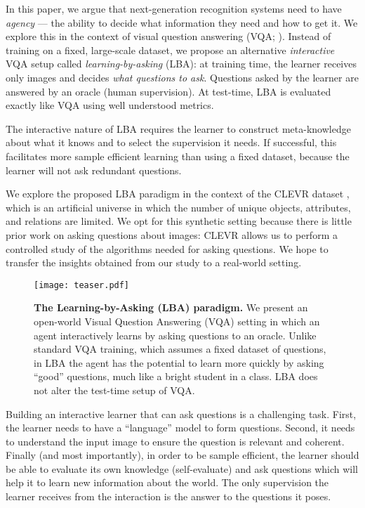 \documentclass[10pt,twocolumn,letterpaper]{article}
\begin{document}
In this paper, we argue that next-generation recognition systems need to have \emph{agency} --- the ability to decide what information they need and how to get it. We explore this in the context of visual question answering (VQA; \cite{antol15vqa,johnson16clevr,zhu16visual7w}). Instead of training on a fixed, large-scale dataset, we propose an alternative \emph{interactive} VQA setup called \emph{learning-by-asking} (LBA): at training time, the learner receives only images and decides \emph{what questions to ask}. Questions asked by the learner are answered by an oracle (human supervision). At test-time, LBA is evaluated exactly like VQA using well understood metrics.


The interactive nature of LBA requires the learner to construct meta-knowledge about what it knows and to select the supervision it needs. If successful, this facilitates more sample efficient learning than using a fixed dataset, because the learner will not ask redundant questions.

We explore the proposed LBA paradigm in the context of the CLEVR dataset \cite{johnson16clevr}, which is an artificial universe in which the number of unique objects, attributes, and relations are limited. We opt for this synthetic setting because there is little prior work on asking questions about images: CLEVR allows us to perform a controlled study of the algorithms needed for asking questions. We hope to transfer the insights obtained from our study to a real-world setting. 
\begin{figure}[!t]
    \centering
    \texttt{[image: teaser.pdf]}
    \caption{\textbf{The Learning-by-Asking (LBA) paradigm.} We present an open-world Visual Question Answering (VQA) setting in which an agent interactively learns by asking questions to an oracle. Unlike standard VQA training, which assumes a fixed dataset of questions, in LBA the agent has the potential to learn more quickly by asking ``good'' questions, much like a bright student in a class. LBA does not alter the test-time setup of VQA.}
    \label{fig:teaser}
\end{figure}

Building an interactive learner that can ask questions is a challenging task. First, the learner needs to have a ``language'' model to form questions. Second, it needs to understand the input image to ensure the question is relevant and coherent. Finally (and most importantly), in order to be sample efficient, the learner should be able to evaluate its own knowledge (self-evaluate) and ask questions which will help it to learn new information about the world. The only supervision the learner receives from the interaction is the answer to the questions it poses.
\end{document}
